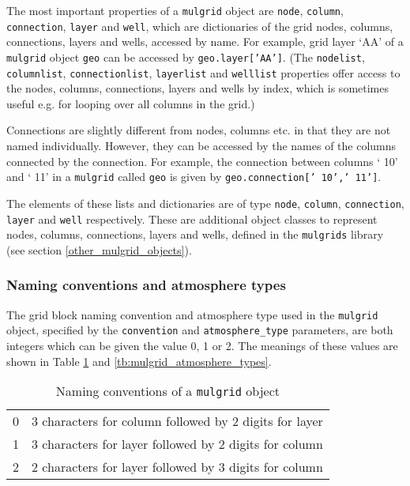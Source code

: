 The most important properties of a \texttt{mulgrid} object are \texttt{node}, \texttt{column}, \texttt{connection}, \texttt{layer} and \texttt{well}, which are dictionaries of the grid nodes, columns, connections, layers and wells, accessed by name.  For example, grid layer `AA' of a \texttt{mulgrid} object \texttt{geo} can be accessed by \texttt{geo.layer['AA']}.  (The \texttt{nodelist}, \texttt{columnlist}, \texttt{connectionlist}, \texttt{layerlist} and \texttt{welllist} properties offer access to the nodes, columns, connections, layers and wells by index, which is sometimes useful e.g. for looping over all columns in the grid.)

Connections are slightly different from nodes, columns etc. in that they are not named individually.  However, they can be accessed by the names of the columns connected by the connection.  For example, the connection between columns ` 10' and ` 11' in a \texttt{mulgrid} called \texttt{geo} is given by \texttt{geo.connection[' 10',' 11']}.

The elements of these lists and dictionaries are of type \texttt{node}, \texttt{column}, \texttt{connection}, \texttt{layer} and \texttt{well} respectively.  These are additional object classes to represent nodes, columns, connections, layers and wells, defined in the \texttt{mulgrids} library (see section \ref{other_mulgrid_objects}).

\subsubsection{Naming conventions and atmosphere types}

The grid block naming convention and atmosphere type used in the \texttt{mulgrid} object, specified by the \texttt{convention} and \texttt{atmosphere\_type} parameters, are both integers which can be given the value 0, 1 or 2.  The meanings of these values are shown in Table \ref{tb:mulgrid_conventions} and \ref{tb:mulgrid_atmosphere_types}.

\begin{table}
  \begin{center}
    \begin{tabular}{|l|l|}
      \hline
      0 & 3 characters for column followed by 2 digits for layer \\
      1 & 3 characters for layer followed by 2 digits for column \\
      2 & 2 characters for layer followed by 3 digits for column \\
      \hline
    \end{tabular}
    \caption{Naming conventions of a \texttt{mulgrid} object}
    \label{tb:mulgrid_conventions}
  \end{center}
\end{table}


